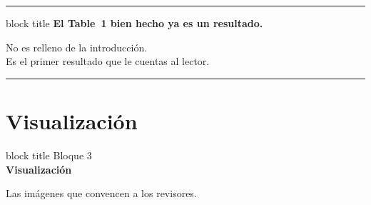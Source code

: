 \documentclass[aspectratio=169,10pt]{beamer}
\begin{document}
\begin{frame}
  \begin{center}
    \vspace{4mm}
    {\color{UCblue!30}\rule{\textwidth}{1.5pt}}
    \vspace{6mm}
    \begin{beamercolorbox}[sep=18pt,center,rounded=true,shadow=true]{block title}
      \LARGE\bfseries El Table~1 bien hecho ya es un resultado.
    \end{beamercolorbox}
    \vspace{6mm}
    {\Large No es relleno de la introducción.}\\[4mm]
    {\Large Es el primer resultado que le cuentas al lector.}
    \vspace{6mm}
    {\color{UCblue!30}\rule{\textwidth}{1.5pt}}
  \end{center}
\end{frame}

\section{Visualización}

\begin{frame}[plain]
  \begin{center}
    \vspace{14mm}
    \begin{beamercolorbox}[sep=22pt,center,rounded=true,shadow=true]{block title}
      {\large Bloque 3}\\[4mm]
      \LARGE\bfseries Visualización
    \end{beamercolorbox}
    \vspace{8mm}
    {\large\color{UCgray} Las imágenes que convencen a los revisores.}
  \end{center}
\end{frame}
\end{document}
